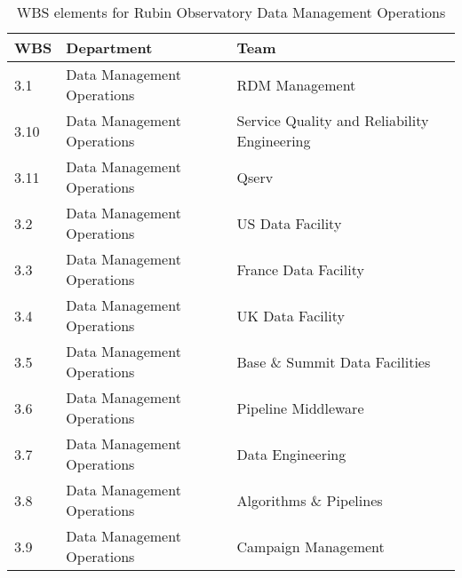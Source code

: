 \normalsize \begin{longtable} {|p{}|l|l|} \caption{WBS elements for Rubin Observatory Data Management Operations \label{tab:dmwbs}}\\ 
\hline 
\textbf{WBS}&\textbf{Department}&\textbf{Team} \\ \hline
{3.1}&{Data Management Operations}&{RDM Management} \\ \hline
{3.10}&{Data Management Operations}&{Service Quality and Reliability Engineering} \\ \hline
{3.11}&{Data Management Operations}&{Qserv} \\ \hline
{3.2}&{Data Management Operations}&{US Data Facility} \\ \hline
{3.3}&{Data Management Operations}&{France Data Facility} \\ \hline
{3.4}&{Data Management Operations}&{UK Data Facility} \\ \hline
{3.5}&{Data Management Operations}&{Base \& Summit Data Facilities} \\ \hline
{3.6}&{Data Management Operations}&{Pipeline Middleware} \\ \hline
{3.7}&{Data Management Operations}&{Data Engineering} \\ \hline
{3.8}&{Data Management Operations}&{Algorithms \& Pipelines} \\ \hline
{3.9}&{Data Management Operations}&{Campaign Management} \\ \hline
\end{longtable} \normalsize
